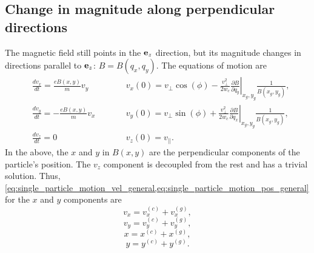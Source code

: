 \documentclass[oneside,a4paper,11pt]{report}
\begin{document}
\subsection{Change in magnitude along perpendicular directions}
The magnetic field still points in the $\mathbf{e}_z$ direction, but its magnitude changes in directions parallel to $\mathbf{e}_z$: $B = B(q_x,q_y)$. The equations of motion are
\begin{subequations}
\begin{alignat}{2}
    &\frac{d v_x}{dt} = \frac{eB(x,y)}{m} v_y  \qquad && v_x(0) = v_\perp \cos(\phi) -\frac{v^2_\perp}{2 w_c} \left . \frac{\partial B}{\partial q_y} \right |_{x_g,y_g} \frac{1}{B(x_g,y_g)}, \label{eq:nonuniB_1} \\
    &\frac{d v_y}{dt} = -\frac{eB(x,y)}{m} v_x  \qquad && v_y(0) = v_\perp \sin(\phi) + \frac{v^2_\perp}{2 w_c} \left . \frac{\partial B}{\partial q_x} \right |_{x_g,y_g} \frac{1}{B(x_g,y_g)}, \label{eq:nonuniB_2} \\
    &\frac{d v_z}{dt} = 0  \qquad && v_z(0) = v_{||}. \label{eq:nonuniB_3}
\end{alignat}
\end{subequations}
In the above, the $x$ and $y$ in $B(x,y)$ are the perpendicular components of the particle's position. The $v_z$ component is decoupled from the rest and has a trivial solution. Thus, \cref{eq:single_particle_motion_vel_general,eq:single_particle_motion_pos_general} for the $x$ and $y$ components are
\begin{equation}
    \label{eq:single_particle_motion_vel_Bmag_change_perp_1}
    v_x = v_x^{(c)} + v_x^{(g)},
\end{equation}
\begin{equation}
    \label{eq:single_particle_motion_vel_Bmag_change_perp_2}
    v_y = v_y^{(c)} + v_y^{(g)},
\end{equation}
\begin{equation}
    \label{eq:single_particle_motion_pos_Bmag_change_perp_1}
    x = x^{(c)} + x^{(g)},
\end{equation}
\begin{equation}
    \label{eq:single_particle_motion_pos_Bmag_change_perp_2}
    y = y^{(c)} + y^{(g)}.
\end{equation}
\end{document}
